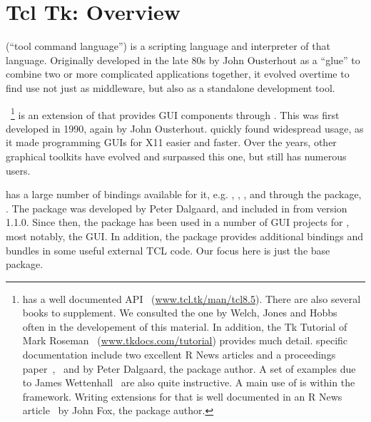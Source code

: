 
\newcommand{\Event}[1]{$<$#1$>$}
\newcommand{\VirtualEvent}[1]{$<<$#1$>>$}



\chapter{Tcl Tk: Overview}
\label{sec:tcltk:overview}

\TCL\/ (``tool command language'') is a scripting language and
interpreter of that language.  Originally developed in the late 80s by
John Ousterhout as a ``glue'' to combine two or more complicated
applications together, it evolved overtime to find use not just as
middleware, but also as a standalone development tool.

\TK~\footnote{
  \Tk{} has a well documented API~\citep{TclTk:Api}
  (\url{www.tcl.tk/man/tcl8.5}).  There are also several books
  to supplement. We consulted the one by Welch, Jones and
  Hobbs~\citep{beedub} often in the developement of this material. In
  addition, the Tk Tutorial of Mark Roseman~\citep{TclTk:Tutorial}
  (\url{www.tkdocs.com/tutorial}) provides much detail. \R{} specific
  documentation include two excellent R News
  articles and a proceedings paper~\citep{Rnews:Dalgaard:2001a},~\citep{Rnewse:Dalgaard:2002}
  and \citep{Dalgaard-DSC} by Peter Dalgaard, the
  package author. A set of examples due to James
  Wettenhall~\citep{Wettenhall} are also quite instructive. A main use
  of  is within the  framework. Writing
  extensions for that is well documented in an R News
  article~\citep{Rnews:Fox:2007} by John Fox, the package author.
}
 is an extension of \TCL\/ that provides GUI components through
\TCL.  This was first developed in 1990, again by John
Ousterhout. \TK\/ quickly found widespread usage, as it made
programming GUIs for X11 easier and faster. Over the years, other
graphical toolkits have evolved and surpassed this one, but \TK\/
still has numerous users.

\TK\/ has a large number of bindings available for it, e.g. , ,
, and through the  package, \R. The  package
was developed by Peter Dalgaard, and  included in \R\/ from version
1.1.0. Since then, the package has been used in a number of GUI 
projects for \R,  most notably, the  GUI. In addition, the
 package provides additional bindings and bundles in some
useful external TCL code. Our focus here is just the base package.

